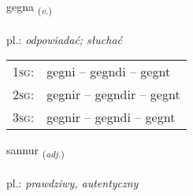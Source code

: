 \documentclass[frontgrid, backgrid]{flacards}\usepackage[]{graphicx}\usepackage[]{xcolor}
\begin{document}
\renewcommand{\flhead}{\vskip5pt \fboxsep=0pt {\small\bfseries\footnotesize Sagnorð | Verb}}
\renewcommand{\fcfoot}{\vskip5pt \fboxsep=0pt \hspace{2pt}{\small\bfseries\footnotesize 1K}}

\renewcommand{\blhead}{\vskip5pt {\small\bfseries\footnotesize Sagnorð | Verb }}
\renewcommand{\bcfoot}{\vskip5pt \hspace{2pt}{\small\bfseries\footnotesize 1K}}


{gegna \small{\textsubscript{(\textit{v.})}} \\[1ex] %
\textphonetic{[cɛkna]} \\
pl.: \emph{odpowiadać; słuchać} \\  [2ex]
\renewcommand*{\arraystretch}{0.8}
\begin{tabular}{p{1cm}l}
\textsc{1sg}: & gegni -- gegndi -- gegnt \\ 
\textsc{2sg}: & gegnir -- gegndir -- gegnt \\ 
\textsc{3sg}: & gegnir -- gegndi -- gegnt \\ 
\end{tabular}
}

\renewcommand{\flhead}{\vskip5pt \fboxsep=0pt {\small\bfseries\footnotesize Lýsingarorð | Adjective}}
\renewcommand{\fcfoot}{\vskip5pt \fboxsep=0pt \hspace{2pt}{\small\bfseries\footnotesize 1K}}

\renewcommand{\blhead}{\vskip5pt {\small\bfseries\footnotesize Lýsingarorð | Adjective }}
\renewcommand{\bcfoot}{\vskip5pt \hspace{2pt}{\small\bfseries\footnotesize 1K}}


{sannur \small{\textsubscript{(\textit{adj.})}} \\[1ex] %
\textphonetic{[sanʏr]} \\
pl.: \emph{prawdziwy, autentyczny} \\  [2ex]
\renewcommand*{\arraystretch}{0.8}
}
\end{document}
